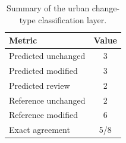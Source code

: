 \begin{table}[htbp]
\centering
\caption{Summary of the urban change-type classification layer.}
\label{tab:urban_change_types}
\begin{tabular}{lc}
\toprule
Metric & Value \\
\midrule
Predicted unchanged & 3 \\
Predicted modified & 3 \\
Predicted review & 2 \\
Reference unchanged & 2 \\
Reference modified & 6 \\
Exact agreement & 5/8 \\
\bottomrule
\end{tabular}
\end{table}